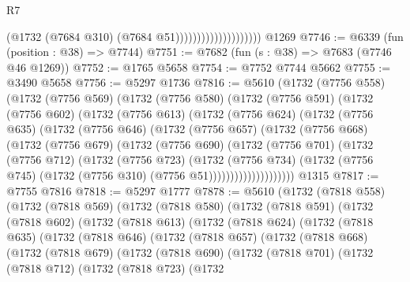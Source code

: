 \begin{lexlean}{R7}
\begin{coremodule}
                                        (@1732 (@7684 @310) (@7684 @51))))))))))))))))))))
    @1269
@7746 := @6339 (fun (position : @38) => @7744)
@7751 := @7682 (fun (s : @38) => @7683 (@7746 @46 @1269))
@7752 := @1765 @5658
@7754 := @7752 @7744 @5662
@7755 := @3490 @5658
@7756 := @5297 @1736
@7816 := @5610
    (@1732
      (@7756 @558)
      (@1732
        (@7756 @569)
        (@1732
          (@7756 @580)
          (@1732
            (@7756 @591)
            (@1732
              (@7756 @602)
              (@1732
                (@7756 @613)
                (@1732
                  (@7756 @624)
                  (@1732
                    (@7756 @635)
                    (@1732
                      (@7756 @646)
                      (@1732
                        (@7756 @657)
                        (@1732
                          (@7756 @668)
                          (@1732
                            (@7756 @679)
                            (@1732
                              (@7756 @690)
                              (@1732
                                (@7756 @701)
                                (@1732
                                  (@7756 @712)
                                  (@1732
                                    (@7756 @723)
                                    (@1732
                                      (@7756 @734)
                                      (@1732
                                        (@7756 @745)
                                        (@1732 (@7756 @310) (@7756 @51))))))))))))))))))))
    @1315
@7817 := @7755 @7816
@7818 := @5297 @1777
@7878 := @5610
    (@1732
      (@7818 @558)
      (@1732
        (@7818 @569)
        (@1732
          (@7818 @580)
          (@1732
            (@7818 @591)
            (@1732
              (@7818 @602)
              (@1732
                (@7818 @613)
                (@1732
                  (@7818 @624)
                  (@1732
                    (@7818 @635)
                    (@1732
                      (@7818 @646)
                      (@1732
                        (@7818 @657)
                        (@1732
                          (@7818 @668)
                          (@1732
                            (@7818 @679)
                            (@1732
                              (@7818 @690)
                              (@1732
                                (@7818 @701)
                                (@1732
                                  (@7818 @712)
                                  (@1732
                                    (@7818 @723)
                                    (@1732

\end{coremodule}
\end{lexlean}
